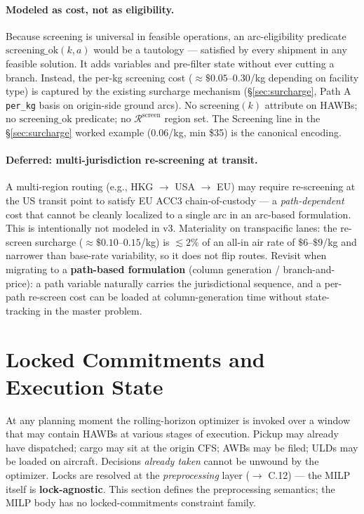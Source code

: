 \documentclass[11pt,a4paper]{article}
\theoremstyle{definition}
\begin{document}
\paragraph{Modeled as cost, not as eligibility.}
Because screening is universal in feasible operations, an arc-eligibility
predicate $\text{screening\_ok}(k, a)$ would be a tautology --- satisfied by
every shipment in any feasible solution. It adds variables and pre-filter
state without ever cutting a branch. Instead, the per-kg screening cost
($\approx \$0.05$--$0.30$/kg depending on facility type) is captured by the
existing surcharge mechanism (\S\ref{sec:surcharge}, Path A
\texttt{per\_kg} basis on origin-side ground arcs). No $\text{screening}(k)$
attribute on HAWBs; no $\text{screening\_ok}$ predicate; no
$\mathcal{R}^{\text{screen}}$ region set. The Screening line in the
\S\ref{sec:surcharge} worked example ($0.06$/kg, min \$35) is the canonical
encoding.

\paragraph{Deferred: multi-jurisdiction re-screening at transit.}
A multi-region routing (e.g., HKG $\to$ USA $\to$ EU) may require re-screening
at the US transit point to satisfy EU ACC3 chain-of-custody --- a
\emph{path-dependent} cost that cannot be cleanly localized to a single arc in
an arc-based formulation. This is intentionally not modeled in v3. Materiality
on transpacific lanes: the re-screen surcharge ($\approx \$0.10$--$0.15$/kg)
is $\lesssim 2\%$ of an all-in air rate of $\$6$--$\$9$/kg and narrower than
base-rate variability, so it does not flip routes. Revisit when migrating to a
\textbf{path-based formulation} (column generation / branch-and-price): a path
variable naturally carries the jurisdictional sequence, and a per-path
re-screen cost can be loaded at column-generation time without state-tracking
in the master problem.

\section{Locked Commitments and Execution State}
\label{sec:locked-commitments}

At any planning moment the rolling-horizon optimizer is invoked over a window
that may contain HAWBs at various stages of execution. Pickup may already
have dispatched; cargo may sit at the origin CFS; AWBs may be filed; ULDs may
be loaded on aircraft. Decisions \emph{already taken} cannot be unwound by the
optimizer. Locks are resolved at the \emph{preprocessing} layer
(\(\to\) C.12) --- the MILP itself is \textbf{lock-agnostic}. This section
defines the preprocessing semantics; the MILP body has no locked-commitments
constraint family.
\end{document}
